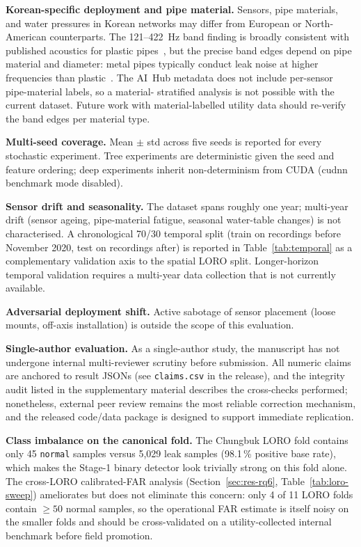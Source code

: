 \documentclass[3p,times,authoryear]{elsarticle}
\theoremstyle{remark}
\begin{document}
\textbf{Korean-specific deployment and pipe material.} Sensors,
pipe materials, and water pressures in Korean networks may differ
from European or North-American counterparts. The 121--422~Hz
band finding is broadly consistent with published acoustics for
plastic pipes~\cite{hunaidi2000plastic,almeida2014leak}, but the
precise band edges depend on pipe material and diameter:
metal pipes typically conduct leak noise at higher frequencies
than plastic~\cite{hunaidi2000plastic}. The AI~Hub metadata does
not include per-sensor pipe-material labels, so a material-
stratified analysis is not possible with the current dataset.
Future work with material-labelled utility data should re-verify
the band edges per material type.

\textbf{Multi-seed coverage.} Mean $\pm$ std across five seeds
is reported for every stochastic experiment. Tree experiments are
deterministic given the seed and feature ordering; deep
experiments inherit non-determinism from CUDA (cudnn benchmark
mode disabled).

\textbf{Sensor drift and seasonality.} The dataset spans
roughly one year; multi-year drift (sensor ageing, pipe-material
fatigue, seasonal water-table changes) is not characterised.
A chronological 70/30 temporal split (train on recordings before
November 2020, test on recordings after) is reported in
Table~\ref{tab:temporal} as a complementary validation axis to
the spatial LORO split. Longer-horizon temporal validation
requires a multi-year data collection that is not currently
available.

\textbf{Adversarial deployment shift.} Active sabotage of
sensor placement (loose mounts, off-axis installation) is
outside the scope of this evaluation.

\textbf{Single-author evaluation.} As a single-author study, the
manuscript has not undergone internal multi-reviewer scrutiny
before submission. All numeric claims are anchored to result
JSONs (see \texttt{claims.csv} in the release), and the
integrity audit listed in the supplementary material describes
the cross-checks performed; nonetheless, external peer review
remains the most reliable correction mechanism, and the
released code/data package is designed to support immediate
replication.

\textbf{Class imbalance on the canonical fold.}
The Chungbuk LORO fold contains only 45 \texttt{normal}
samples versus 5{,}029 leak samples (98.1\,\% positive base
rate), which makes the Stage-1 binary detector look trivially
strong on this fold alone. The cross-LORO calibrated-FAR
analysis (Section~\ref{sec:res-rq6}, Table~\ref{tab:loro-sweep})
ameliorates but does not eliminate this concern: only 4 of 11
LORO folds contain $\geq 50$ normal samples, so the
operational FAR estimate is itself noisy on the smaller
folds and should be cross-validated on a utility-collected
internal benchmark before field promotion.
\end{document}

